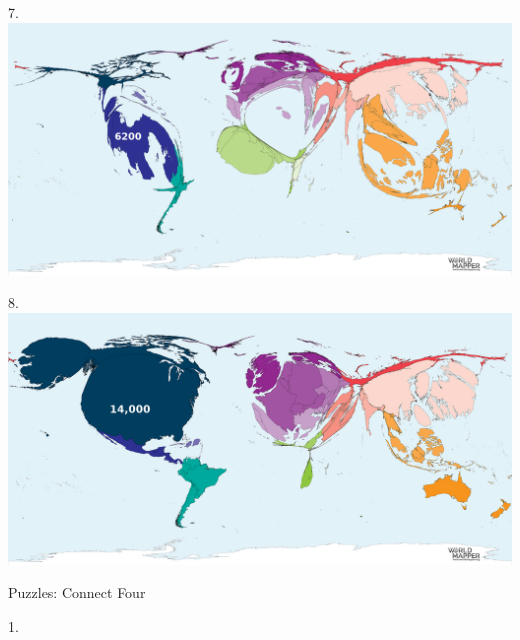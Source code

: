 \begin{frame}
\begin{center}
\Large
7. 
\\
\vspace{0.5em}\includegraphics[height=0.6\paperheight]{maps/picture_7.png}
\\
\end{center}
\end{frame}
\begin{frame}
\begin{center}
\Large
8. 
\\
\vspace{0.5em}\includegraphics[height=0.6\paperheight]{maps/picture_8.png}
\\
\end{center}
\end{frame}
\begin{frame}
\begin{center}
\Huge
Puzzles: Connect Four
\end{center}
\end{frame}
\begin{frame}
\begin{center}
\Large
1. 
\end{center}
\end{frame}
